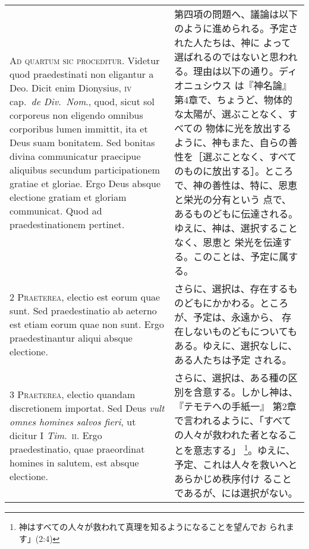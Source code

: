 \documentclass[10pt]{jsarticle} %
\begin{document}
\begin{longtable}{p{21em}p{21em}}

{\Huge A}{\scshape d quartum sic proceditur}. Videtur quod
 praedestinati non eligantur a Deo. Dicit enim Dionysius, {\scshape iv} cap.~{\itshape de Div.~Nom}., quod, sicut sol corporeus non eligendo omnibus corporibus
 lumen immittit, ita et Deus suam bonitatem. Sed bonitas divina
 communicatur praecipue aliquibus secundum participationem gratiae et
 gloriae. Ergo Deus absque electione gratiam et gloriam communicat. Quod
 ad praedestinationem pertinet.


&

第四項の問題へ、議論は以下のように進められる。予定された人たちは、神に
よって選ばれるのではないと思われる。理由は以下の通り。ディオニュシウス
は『神名論』第4章で、ちょうど、物体的な太陽が、選ぶことなく、すべての
物体に光を放出するように、神もまた、自らの善性を［選ぶことなく、すべて
のものに放出する］。ところで、神の善性は、特に、恩恵と栄光の分有という
点で、あるものどもに伝達される。ゆえに、神は、選択することなく、恩恵と
栄光を伝達する。このことは、予定に属する。


\\



{\scshape 2 Praeterea}, electio est eorum quae sunt. Sed
 praedestinatio ab aeterno est etiam eorum quae non sunt. Ergo
 praedestinantur aliqui absque electione.


&

さらに、選択は、存在するものどもにかかわる。ところが、予定は、永遠から、
存在しないものどもについてもある。ゆえに、選択なしに、ある人たちは予定
される。


\\



{\scshape 3 Praeterea}, electio quandam discretionem
 importat. Sed Deus {\itshape vult omnes homines salvos fieri}, ut dicitur I
 {\itshape Tim}.~{\scshape ii}. Ergo praedestinatio, quae praeordinat homines in salutem, est
 absque electione.


&

さらに、選択は、ある種の区別を含意する。しかし神は、『テモテへの手紙一』
第2章で言われるように、「すべての人々が救われた者となることを意志する」
\footnote{神はすべての人々が救われて真理を知るようになることを望んでお
られます」(2:4)}。ゆえに、予定、これは人々を救いへとあらかじめ秩序付け
ることであるが、には選択がない。

\\




\end{longtable}
\end{document}
